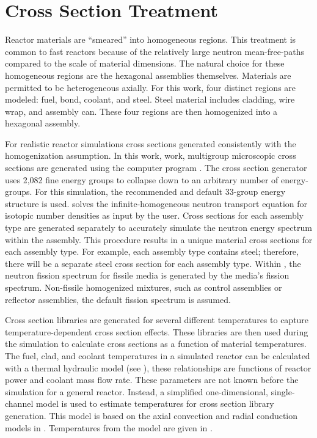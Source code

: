\section{Cross Section Treatment}
  \label{sec:cross_section_treatment}
  Reactor materials are ``smeared'' into homogeneous regions. This treatment is
  common to fast reactors because of the relatively large neutron
  mean-free-paths compared to the scale of material dimensions. The natural
  choice for these homogeneous regions are the hexagonal assemblies themselves.
  Materials are permitted to be heterogeneous axially.  For this work, four
  distinct regions are modeled: fuel, bond, coolant, and steel. Steel material
  includes cladding, wire wrap, and assembly can. These four regions are then
  homogenized into a hexagonal assembly.

  For realistic reactor simulations cross sections generated consistently with
  the homogenization assumption. In this work, work, multigroup microscopic
  cross sections are generated using the computer program \mcc \cite{mcc}.  The
  cross section generator uses 2,082 fine energy groups to collapse down to an
  arbitrary number of energy-groups. For this simulation, the recommended and
  default 33-group energy structure is used. \mcc solves the
  infinite-homogeneous neutron transport equation for isotopic number densities
  as input by the user.  Cross sections for each assembly type are generated
  separately to accurately simulate the neutron energy spectrum within the
  assembly. This procedure results in a unique material cross sections for each
  assembly type. For example, each assembly type contains steel; therefore,
  there will be a separate steel cross section for each assembly type. Within
  \mcc, the neutron fission  spectrum for fissile media is generated by the
  media's fission spectrum.  Non-fissile homogenized mixtures, such as control
  assemblies or reflector assemblies, the default  fission
  spectrum is assumed.

  Cross section libraries are generated for several different temperatures to
  capture temperature-dependent cross section effects. These libraries are then
  used during the simulation to calculate cross sections as a function of
  material temperatures.  The fuel, clad, and coolant temperatures in a
  simulated reactor can be calculated with a thermal hydraulic model (see
  ), these relationships are functions of reactor
  power and coolant mass flow rate. These parameters are not known before the
  simulation for a general reactor. Instead, a simplified one-dimensional,
  single-channel model is used to estimate temperatures for cross section
  library generation. This model is based on the axial convection and radial
  conduction models in . Temperatures from the model
  are given in .

